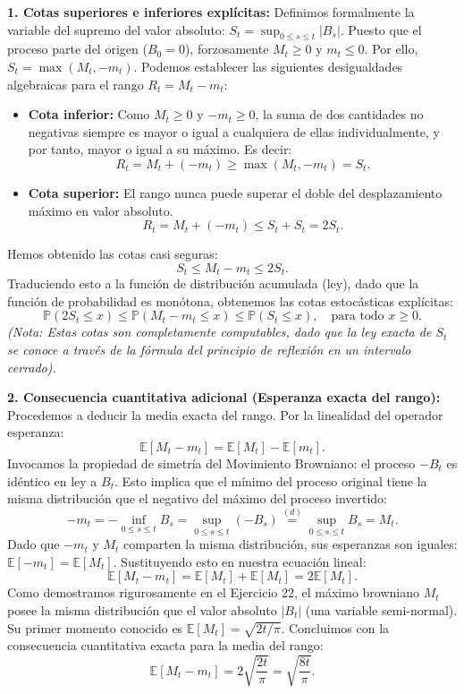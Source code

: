 \documentclass[11pt, letterpaper]{article}
\begin{document}
\begin{solucion}
    \textbf{1. Cotas superiores e inferiores explícitas:}
    Definimos formalmente la variable del supremo del valor absoluto: $S_t = \sup_{0 \le s \le t} |B_s|$.
    Puesto que el proceso parte del origen ($B_0 = 0$), forzosamente $M_t \ge 0$ y $m_t \le 0$. Por ello, $S_t = \max(M_t, -m_t)$.
    Podemos establecer las siguientes desigualdades algebraicas para el rango $R_t = M_t - m_t$:
    \begin{itemize}
        \item \textbf{Cota inferior:} Como $M_t \ge 0$ y $-m_t \ge 0$, la suma de dos cantidades no negativas siempre es mayor o igual a cualquiera de ellas individualmente, y por tanto, mayor o igual a su máximo. Es decir:
        \[ R_t = M_t + (-m_t) \ge \max(M_t, -m_t) = S_t. \]
        \item \textbf{Cota superior:} El rango nunca puede superar el doble del desplazamiento máximo en valor absoluto.
        \[ R_t = M_t + (-m_t) \le S_t + S_t = 2S_t. \]
    \end{itemize}
    Hemos obtenido las cotas casi seguras:
    \[ S_t \le M_t - m_t \le 2S_t. \]
    Traduciendo esto a la función de distribución acumulada (ley), dado que la función de probabilidad es monótona, obtenemos las cotas estocásticas explícitas:
    \[ \mathbb{P}(2S_t \le x) \le \mathbb{P}(M_t - m_t \le x) \le \mathbb{P}(S_t \le x), \quad \text{para todo } x \ge 0. \]
    \textit{(Nota: Estas cotas son completamente computables, dado que la ley exacta de $S_t$ se conoce a través de la fórmula del principio de reflexión en un intervalo cerrado).}

    \textbf{2. Consecuencia cuantitativa adicional (Esperanza exacta del rango):}
    Procedemos a deducir la media exacta del rango. Por la linealidad del operador esperanza:
    \[ \mathbb{E}[M_t - m_t] = \mathbb{E}[M_t] - \mathbb{E}[m_t]. \]
    Invocamos la propiedad de simetría del Movimiento Browniano: el proceso $-B_t$ es idéntico en ley a $B_t$. Esto implica que el mínimo del proceso original tiene la misma distribución que el negativo del máximo del proceso invertido:
    \[ -m_t = -\inf_{0 \le s \le t} B_s = \sup_{0 \le s \le t} (-B_s) \stackrel{(d)}{=} \sup_{0 \le s \le t} B_s = M_t. \]
    Dado que $-m_t$ y $M_t$ comparten la misma distribución, sus esperanzas son iguales: $\mathbb{E}[-m_t] = \mathbb{E}[M_t]$.
    Sustituyendo esto en nuestra ecuación lineal:
    \[ \mathbb{E}[M_t - m_t] = \mathbb{E}[M_t] + \mathbb{E}[M_t] = 2\mathbb{E}[M_t]. \]
    Como demostramos rigurosamente en el Ejercicio 22, el máximo browniano $M_t$ posee la misma distribución que el valor absoluto $|B_t|$ (una variable semi-normal). Su primer momento conocido es $\mathbb{E}[M_t] = \sqrt{2t/\pi}$.
    Concluimos con la consecuencia cuantitativa exacta para la media del rango:
    \[ \mathbb{E}[M_t - m_t] = 2\sqrt{\frac{2t}{\pi}} = \sqrt{\frac{8t}{\pi}}. \]
\end{solucion}
\end{document}
